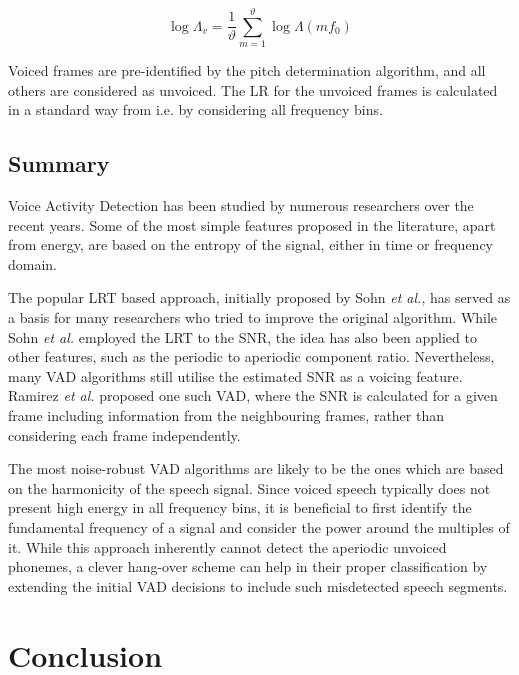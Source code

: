 \begin{equation}
\log \Lambda_v = \frac{1}{\vartheta} \sum_{m=1}^{\vartheta} \log \Lambda(m f_0)
\label{eq:harmfreq}
\end{equation}

Voiced frames are pre-identified by the pitch determination algorithm, and all others are considered as unvoiced. The LR for the unvoiced frames is calculated in a standard way from \cite{SohnInitial} i.e. by considering all frequency bins.

\subsection{Summary}

Voice Activity Detection has been studied by numerous researchers over the recent years. Some of the most simple features proposed in the literature, apart from energy, are based on the entropy of the signal, either in time or frequency domain.

The popular LRT based approach, initially proposed by Sohn \emph{et al.}, has served as a basis for many researchers who tried to improve the original algorithm. While Sohn \emph{et al.} employed the LRT to the SNR, the idea has also been applied to other features, such as the periodic to aperiodic component ratio. Nevertheless, many VAD algorithms still utilise the estimated SNR as a voicing feature. Ramirez \emph{et al.} proposed one such VAD, where the SNR is calculated for a given frame including information from the neighbouring frames, rather than considering each frame independently.

The most noise-robust VAD algorithms are likely to be the ones which are based on the harmonicity of the speech signal. Since voiced speech typically does not present high energy in all frequency bins, it is beneficial to first identify the fundamental frequency of a signal and consider the power around the multiples of it. While this approach inherently cannot detect the aperiodic unvoiced phonemes, a clever hang-over scheme can help in their proper classification by extending the initial VAD decisions to include such misdetected speech segments.


\section{Conclusion}

